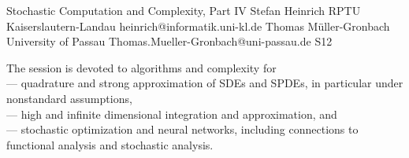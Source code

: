 \begin{session}
 {Stochastic Computation and Complexity, Part IV}%
 {Stefan Heinrich}%
 {RPTU Kaiserslautern-Landau}%
 {heinrich@informatik.uni-kl.de}%
 {Thomas M\"uller-Gronbach}%
 {University of Passau}%
 {Thomas.Mueller-Gronbach@uni-passau.de}%
 {S12}%
 {}%

 The session is devoted to algorithms and complexity for\\
 --- quadrature and strong approximation of SDEs and SPDEs, in particular under nonstandard assumptions,\\
 --- high and infinite dimensional integration and approximation, and\\
 --- stochastic optimization and neural networks,
 including connections to functional analysis and stochastic analysis.
\end{session}



\clearpage

